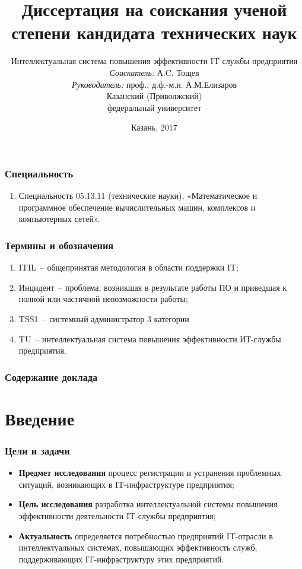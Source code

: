 \documentclass[14pt]{beamer}
\title{\small{Диссертация на соискания ученой степени кандидата технических наук}}
\author{
Интеллектуальная система повышения эффективности IT службы предприятия\\
\small{%
\emph{Соискатель:} А.C. Тощев\\%
\emph{Руководитель:} проф., д.ф.-м.н. А.М.Елизаров}\\%
\vspace{30pt}%
Казанский (Приволжский)\\
федеральный университет%
\vspace{20pt}%
}
\date{\small{Казань, 2017}}
\begin{document}
\maketitle

\begin{frame}
\frametitle{Специальность}
\begin{enumerate}
    \item Специальность 05.13.11 (технические науки), «Математическое и программное обеспечение вычислительных машин, комплексов и компьютерных сетей».
\end{enumerate}
\end{frame}


\begin{frame}
\frametitle{Термины и обозначения}
\begin{enumerate}
    \item ITIL~-- общепринятая методология в области поддержки IT;
    \item Инцидент~-- проблема, возникшая в результате работы ПО и приведшая к полной или частичной невозможности работы;
    \item TSS1~-- системный администратор 3 категории
    \item TU~-- интеллектуальная система повышения эффективности ИТ-службы предприятия.
  
\end{enumerate}
\end{frame}


  \begin{frame}
   \frametitle{Содержание доклада}
    \tableofcontents
   \end{frame}


\AtBeginSection[] %
{
\begin{frame}
\frametitle{}
\tableofcontents[current]
	
\end{frame}
}
% 
%
\section[Введение]{Введение}

\begin{frame}
\frametitle{Цели и задачи}
\begin{itemize}
  \item \textbf{Предмет исследования} процесс регистрации и устранения проблемных ситуаций, возникающих в IT-инфраструктуре предприятия;
  \item \textbf{Цель исследования} разработка интеллектуальной системы повышения эффективности деятельности IT-службы предприятия;
  \item \textbf{Актуальность} определяется потребностью предприятий IT-отрасли в интеллектуальных системах, повышающих эффективность служб, поддерживающих IT-инфраструктуру этих предприятий.
\end{itemize}
\end{frame}
\end{document}
